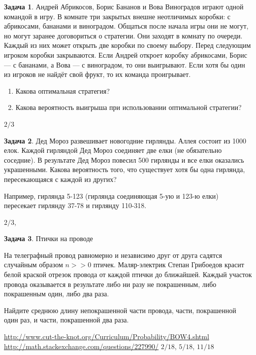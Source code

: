 \documentclass[nobib]{tufte-handout}
\theoremstyle{definition}
\newtheorem{problem}{Задача}
\begin{document}
\begin{problem}
Андрей Абрикосов, Борис Бананов и Вова Виноградов играют одной командой в игру. В комнате три закрытых внешне неотличимых коробки: с абрикосами, бананами и виноградом. Общаться после начала игры они не могут, но могут заранее договориться о стратегии. Они заходят в комнату по очереди. Каждый из них может открыть две коробки по своему выбору. Перед следующим игроком коробки закрываются. Если Андрей откроет коробку абрикосами, Борис — с бананами, а Вова — с виноградом, то они выигрывают. Если хотя бы один из игроков не найдёт свой фрукт, то их команда проигрывает.

\begin{enumerate}
\item Какова оптимальная стратегия?

\item Какова вероятность выигрыша при использовании оптимальной стратегии?
\end{enumerate}


\begin{sol}
$2/3$
\end{sol}

\end{problem}


\begin{problem}
Дед Мороз развешивает новогодние гирлянды. Аллея состоит из 1000 елок. Каждой гирляндой Дед Мороз соединяет две елки (не обязательно соседние). В результате Дед Мороз повесил 500 гирлянды и все елки оказались украшенными. Какова вероятность того, что существует хотя бы одна гирлянда, пересекающаяся с каждой из других?

Например, гирлянда 5-123 (гирлянда соединяющая 5-ую и 123-ю елки) пересекает гирлянду 37-78 и гирлянду 110-318.

\begin{sol}
$2/3$, \cite{gravner20problems}
\end{sol}


\end{problem}


\begin{problem}
Птички на проводе

На телеграфный провод равномерно и независимо друг от друга садятся случайным образом  $n>>0$ птичек. Маляр-электрик Степан Грибоедов красит белой краской отрезок провода от каждой птички до ближайшей. Каждый участок провода оказывается в результате либо ни разу не покрашенным, либо покрашенным один, либо два раза.

Найдите среднюю длину непокрашенной части провода, части, покрашенной один раз, и части, покрашенной два раза.

\begin{sol}
\url{http://www.cut-the-knot.org/Curriculum/Probability/BOW4.shtml}
\url{http://math.stackexchange.com/questions/227990/}
$2/18$, $5/18$, $11/18$
\end{sol}

\end{problem}
\end{document}
